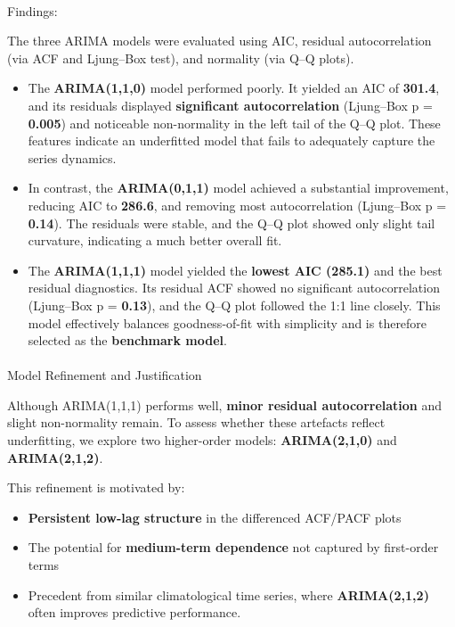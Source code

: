 \documentclass[
  11pt,
]{article}
\makeatletter
\let\oldparagraph\paragraph
\renewcommand{\paragraph}{
    \@ifstar
      \xxxParagraphStar
      \xxxParagraphNoStar
  }
\newcommand{\xxxParagraphStar}[1]{\oldparagraph*{#1}\mbox{}}
\newcommand{\xxxParagraphNoStar}[1]{\oldparagraph{#1}\mbox{}}
\makeatother
\begin{document}
\paragraph{Findings:}\label{findings}

The three ARIMA models were evaluated using AIC, residual
autocorrelation (via ACF and Ljung--Box test), and normality (via Q--Q
plots).

\begin{itemize}
\item
  The \textbf{ARIMA(1,1,0)} model performed poorly. It yielded an AIC of
  \textbf{301.4}, and its residuals displayed \textbf{significant
  autocorrelation} (Ljung--Box p = \textbf{0.005}) and noticeable
  non-normality in the left tail of the Q--Q plot. These features
  indicate an underfitted model that fails to adequately capture the
  series dynamics.
\item
  In contrast, the \textbf{ARIMA(0,1,1)} model achieved a substantial
  improvement, reducing AIC to \textbf{286.6}, and removing most
  autocorrelation (Ljung--Box p = \textbf{0.14}). The residuals were
  stable, and the Q--Q plot showed only slight tail curvature,
  indicating a much better overall fit.
\item
  The \textbf{ARIMA(1,1,1)} model yielded the \textbf{lowest AIC
  (285.1)} and the best residual diagnostics. Its residual ACF showed no
  significant autocorrelation (Ljung--Box p = \textbf{0.13}), and the
  Q--Q plot followed the 1:1 line closely. This model effectively
  balances goodness-of-fit with simplicity and is therefore selected as
  the \textbf{benchmark model}.
\end{itemize}

\paragraph{Model Refinement and
Justification}\label{model-refinement-and-justification}

Although ARIMA(1,1,1) performs well, \textbf{minor residual
autocorrelation} and slight non-normality remain. To assess whether
these artefacts reflect underfitting, we explore two higher-order
models: \textbf{ARIMA(2,1,0)} and \textbf{ARIMA(2,1,2)}.

This refinement is motivated by:

\begin{itemize}
\item
  \textbf{Persistent low-lag structure} in the differenced ACF/PACF
  plots
\item
  The potential for \textbf{medium-term dependence} not captured by
  first-order terms
\item
  Precedent from similar climatological time series, where
  \textbf{ARIMA(2,1,2)} often improves predictive performance.
\end{itemize}
\end{document}
